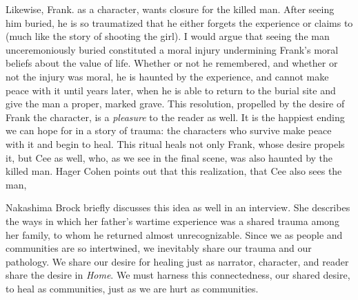 \documentclass[12pt]{article}
\begin{document}
Likewise, Frank. as a character, wants closure for the killed man. After seeing
him buried, he is so traumatized that he either forgets the experience or
claims to (much like the story of shooting the girl).\autocite[p.
5-6]{Morrison12} I would argue that seeing the man unceremoniously buried
constituted a moral injury undermining Frank's moral beliefs about the value of
life. Whether or not he remembered, and whether or not the injury was moral, he
is haunted by the experience, and cannot make peace with it until years later,
when he is able to return to the burial site and give the man a proper, marked
grave. This resolution, propelled by the desire of Frank the character, is a
\emph{pleasure} to the reader as well. It is the happiest ending we can hope
for in a story of trauma: the characters who survive make peace with it and
begin to heal. This ritual heals not only Frank, whose desire propels it, but
Cee as well, who, as we see in the final scene, was also haunted by the killed
man. Hager Cohen points out that this realization, that Cee also sees the man,
\autocite{HagerCohen12}

Nakashima Brock briefly discusses this idea as well in an interview. She
describes the ways in which her father's wartime experience was a shared trauma
among her family, to whom he returned almost
unrecognizable.\autocite{Brock15} Since we as people and communities are
so intertwined, we inevitably share our trauma and our pathology. We share our
desire for healing just as narrator, character, and reader share the desire in
\emph{Home}. We must harness this connectedness, our shared desire, to heal as
communities, just as we are hurt as communities.

\end{document}
